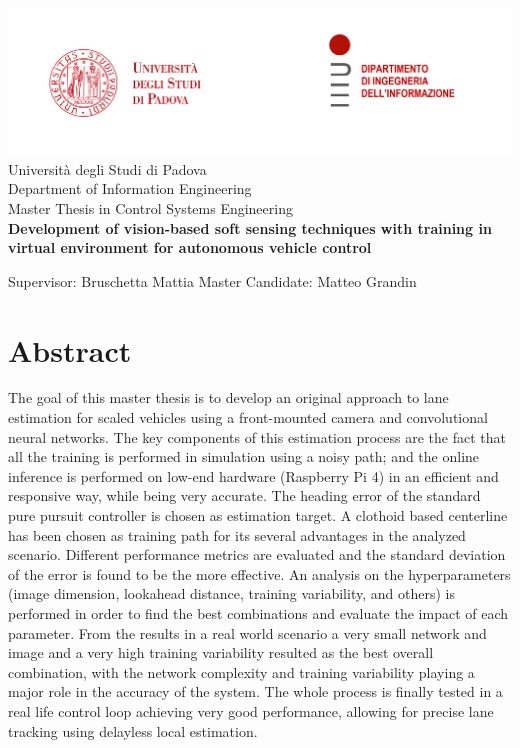 \documentclass[a4paper,12pt,sort&compress]{article}
\begin{document}
\begin{titlepage}
    \centering
    \includegraphics[width=\linewidth]{loghi.png} %
    {\large
       Università degli Studi di Padova \\
       Department of Information Engineering\\
        Master Thesis in Control Systems Engineering\\
    }
        \vskip2cm
    {\bfseries\Large
        Development of vision-based soft sensing techniques with training in virtual environment for autonomous vehicle control\\
    }    
        \vskip2cm
    {\large
        \raggedright
        Supervisor: Bruschetta Mattia
        \vskip2cm
        \raggedleft
        Master Candidate: Matteo Grandin
    }
    \vfill

\end{titlepage}


\section{Abstract}
    The goal of this master thesis is to develop an original approach to lane estimation for scaled
    vehicles using a front-mounted camera and convolutional  neural networks. The key components of
    this estimation process are the fact that all the training is performed in simulation using a
    noisy path; and the online inference is performed on low-end hardware (Raspberry Pi 4) in an
    efficient and responsive way, while being very accurate. The heading error of the standard pure
    pursuit controller is chosen as estimation target. A clothoid based centerline has been chosen
    as training path for its several advantages in the analyzed scenario. Different performance
    metrics are evaluated and the standard deviation of the error is found to be the more effective. An
    analysis on the hyperparameters (image dimension, lookahead distance,
    training variability, and others) is performed in order to find the best combinations and
    evaluate the impact of each parameter. From the results in a real world scenario a very small
    network and image and a very high training variability resulted as the best overall combination,
    with the network complexity and training variability playing a major role in the accuracy of the
    system. The whole process is finally tested in a real life control loop achieving very good
    performance, allowing for precise lane tracking using delayless local estimation.
    \newpage
\end{document}
